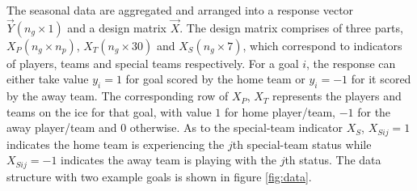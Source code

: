 The seasonal data are aggregated and arranged into a response vector $\vec{Y}(n_g \times 1)$ and a design matrix $\vec{X}$. The design matrix comprises of three parts, $X_P(n_g\times n_p)$, $X_T(n_g\times 30)$ and $X_S(n_g\times 7)$, which correspond to indicators of players, teams and special teams respectively. For a goal $i$, the response can either take value $y_i=1$ for goal scored by the home team or $y_i={-1}$ for it scored by the away team. The corresponding row of $X_P$, $X_T$ represents the players and teams on the ice for that goal, with value $1$ for home player/team, ${-1}$ for the away player/team and $0$ otherwise. As to the special-team indicator $X_S$, $X_{Sij}=1$ indicates the home team is experiencing the $j$th special-team status while $X_{Sij}=-1$ indicates the away team is playing with the $j$th status. The data structure with two example goals is shown in figure \ref{fig:data}.

